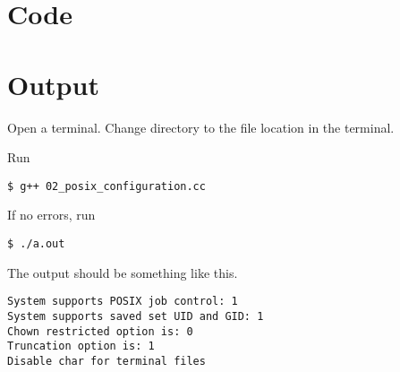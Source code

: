 \section{Code}



\section{Output}

Open a terminal. Change directory to the file location in the terminal.

Run
\begin{lstlisting}[style=shell-command]
$ g++ 02_posix_configuration.cc
\end{lstlisting}

If no errors, run
\begin{lstlisting}[style=shell-command]
$ ./a.out
\end{lstlisting}

The output should be something like this.
\begin{lstlisting}[style=shell-output]
System supports POSIX job control: 1
System supports saved set UID and GID: 1
Chown restricted option is: 0
Truncation option is: 1
Disable char for terminal files
\end{lstlisting}
